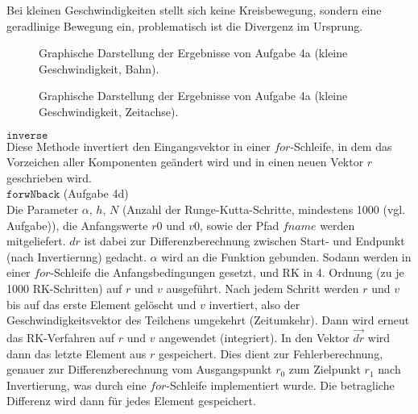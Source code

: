 Bei kleinen Geschwindigkeiten stellt sich keine Kreisbewegung, sondern eine geradlinige Bewegung ein, problematisch ist die Divergenz im Ursprung.

\begin{landscape}
	\begin{figure}
		\caption{Graphische Darstellung der Ergebnisse von Aufgabe 4a (kleine Geschwindigkeit, Bahn).}
		\label{fig:4aklvBahn}
	\end{figure}
\end{landscape} 

\begin{landscape}
	\begin{figure}
		\caption{Graphische Darstellung der Ergebnisse von Aufgabe 4a (kleine Geschwindigkeit, Zeitachse).}
		\label{fig:4aklvZeit}
	\end{figure}
\end{landscape} 
	
	$\texttt{inverse}$\\
Diese Methode invertiert den Eingangsvektor in einer $\textit{for}$-Schleife, in dem das Vorzeichen aller Komponenten geändert wird und in einen neuen Vektor $r$ geschrieben wird.\\
	
	$\texttt{forwNback}$ (Aufgabe 4d)\\
Die Parameter $\alpha$, $h$, $N$ (Anzahl der Runge-Kutta-Schritte, mindestens 1000 (vgl. Aufgabe)), die Anfangswerte $r0$ und $v0$, sowie der Pfad $\textit{fname}$ werden mitgeliefert. $dr$ ist dabei zur Differenzberechnung zwischen Start- und Endpunkt (nach Invertierung) gedacht. $\alpha$ wird an die Funktion gebunden. Sodann werden in einer $\textit{for}$-Schleife die Anfangsbedingungen gesetzt, und RK in 4. Ordnung (zu je 1000 RK-Schritten) auf $r$ und $v$ ausgeführt. Nach jedem Schritt werden $r$ und $v$ bis auf das erste Element gelöscht und $v$ invertiert, also der Geschwindigkeitsvektor des Teilchens umgekehrt (Zeitumkehr). Dann wird erneut das RK-Verfahren auf $r$ und $v$ angewendet (integriert). In den Vektor $\vec{dr}$ wird dann das letzte Element aus $r$ gespeichert. Dies dient zur Fehlerberechnung, genauer zur Differenzberechnung vom Ausgangspunkt $r_0$ zum Zielpunkt $r_1$ nach Invertierung, was durch eine $\textit{for}$-Schleife implementiert wurde. Die betragliche Differenz wird dann für jedes Element gespeichert.\\


